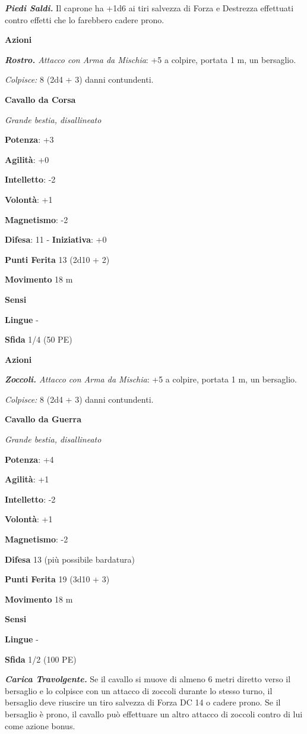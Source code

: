 \begin{multicols}{2}
\emph{\textbf{Piedi Saldi.}} Il caprone ha +1d6 ai tiri salvezza di
Forza e Destrezza effettuati contro effetti che lo farebbero cadere
prono.

\smallskip\textbf{Azioni}

\emph{\textbf{Rostro.} Attacco con Arma da Mischia}: +5 a colpire,
portata 1 m, un bersaglio.

\emph{Colpisce:} 8 (2d4 + 3) danni contundenti.

\textbf{Cavallo da Corsa}

\emph{Grande bestia, disallineato}

\textbf{Potenza}: +3

\textbf{Agilità}: +0

\textbf{Intelletto}: -2

\textbf{Volontà}: +1

\textbf{Magnetismo}: -2

\textbf{Difesa}: 11 - \textbf{Iniziativa}: +0

\textbf{Punti Ferita} 13 (2d10 + 2)

\textbf{Movimento} 18 m

\textbf{Sensi} 

\textbf{Lingue} -

\textbf{Sfida} 1/4 (50 PE)\smallskip

\smallskip\textbf{Azioni}

\emph{\textbf{Zoccoli.} Attacco con Arma da Mischia}: +5 a colpire,
portata 1 m, un bersaglio.

\emph{Colpisce:} 8 (2d4 + 3) danni contundenti.



\textbf{Cavallo da Guerra}

\emph{Grande bestia, disallineato}

\textbf{Potenza}: +4

\textbf{Agilità}: +1

\textbf{Intelletto}: -2

\textbf{Volontà}: +1

\textbf{Magnetismo}: -2

\textbf{Difesa} 13 (più possibile bardatura)

\textbf{Punti Ferita} 19 (3d10 + 3)

\textbf{Movimento} 18 m

\textbf{Sensi} 

\textbf{Lingue} -

\textbf{Sfida} 1/2 (100 PE)\smallskip

\emph{\textbf{Carica Travolgente.}} Se il cavallo si muove di almeno 6
metri diretto verso il bersaglio e lo colpisce con un attacco di zoccoli
durante lo stesso turno, il bersaglio deve riuscire un tiro salvezza di Forza DC 14 o cadere prono. Se il bersaglio è prono, il cavallo può
effettuare un altro attacco di zoccoli contro di lui come azione bonus.


\end{multicols}
